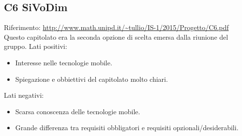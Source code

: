 \documentclass{scalatekids-article}
\begin{document}
\subsection{C6 SiVoDim}
Riferimento: \url{http://www.math.unipd.it/~tullio/IS-1/2015/Progetto/C6.pdf}\\
Questo capitolato era la seconda opzione di scelta emersa dalla riunione del gruppo.
Lati positivi:
\begin{itemize}
\item Interesse nelle tecnologie mobile.
\item Spiegazione e obbiettivi del capitolato molto chiari.
\end{itemize}
Lati negativi:
\begin{itemize}
\item Scarsa conoscenza delle tecnologie mobile.
\item Grande differenza tra requisiti obbligatori e requisiti opzionali/desiderabili.
\end{itemize}
\end{document}
